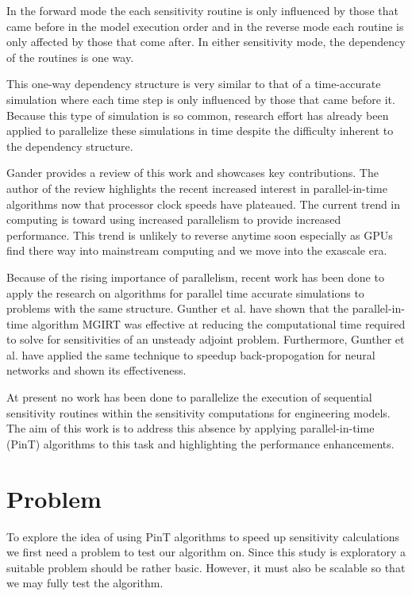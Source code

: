 \documentclass[conf]{new-aiaa}
\begin{document}
In the forward mode the each sensitivity routine is only influenced by those that came before in the model execution order and in the reverse mode each routine is only affected by those that come after.
In either sensitivity mode, the dependency of the routines is one way.

This one-way dependency structure is very similar to that of a time-accurate simulation where each time step is only influenced by those that came before it.
Because this type of simulation is so common, research effort has already been applied to parallelize these simulations in time despite the difficulty inherent to the dependency structure.

Gander\cite{Gander2015} provides a review of this work and showcases key contributions.
The author of the review highlights the recent increased interest in parallel-in-time algorithms now that processor clock speeds have plateaued.
The current trend in computing is toward using increased parallelism to provide increased performance.
This trend is unlikely to reverse anytime soon especially as GPUs find there way into mainstream computing and we move into the exascale era.

Because of the rising importance of parallelism, recent work has been done to apply the research on algorithms for parallel time accurate simulations to problems with the same structure.
Gunther et al.\cite{Gunther2019} have shown that the parallel-in-time algorithm MGIRT\cite{Falgout2014} was effective at reducing the computational time required to solve for sensitivities of an unsteady adjoint problem.
Furthermore, Gunther et al.\cite{Gunther2020} have applied the same technique to speedup back-propogation for neural networks and shown its effectiveness.


At present no work has been done to parallelize the execution of sequential sensitivity routines within the sensitivity computations for engineering models.
The aim of this work is to address this absence by applying parallel-in-time (PinT) algorithms to this task and highlighting the performance enhancements.


\section{Problem}
To explore the idea of using PinT algorithms to speed up sensitivity calculations we first need a problem to test our algorithm on.
Since this study is exploratory a suitable problem should be rather basic.
However, it must also be scalable so that we may fully test the algorithm.
\end{document}
